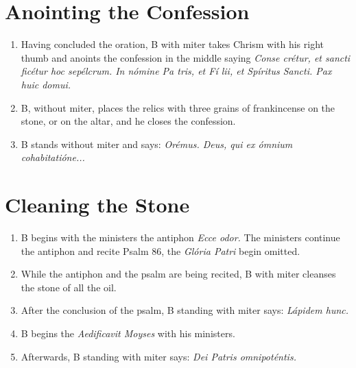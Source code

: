 \documentclass[twocolumn]{report}
\begin{document}
\section*{Anointing the Confession}
\begin{enumerate}
	\item Having concluded the oration, B with miter takes Chrism with his right thumb and anoints the confession in the middle saying \textit{Conse  crétur, et sancti  ficétur hoc sepélcrum. In nómine Pa  tris, et Fí  lii, et Spíritus  Sancti. Pax huic domui.}
	\item B, without miter, places the relics with three grains of frankincense on the stone, or on the altar, and he closes the confession.
	\item B stands without miter and says: \textit{Orémus. Deus, qui ex ómnium cohabitatióne...}
\end{enumerate}
\section*{Cleaning the Stone}
\begin{enumerate}
	\item B begins with the ministers the antiphon \textit{Ecce odor.} The ministers continue the antiphon and recite Psalm 86, the \textit{Glória Patri} begin omitted.
	\item While the antiphon and the psalm are being recited, B with miter cleanses the stone of all the oil.
	\item After the conclusion of the psalm, B standing with miter says: \textit{Lápidem hunc.}
	\item B begins the \textit{Aedificavit Moyses} with his ministers.
	\item Afterwards, B standing with miter says: \textit{Dei Patris omnipoténtis.}
\end{enumerate}
\end{document}
